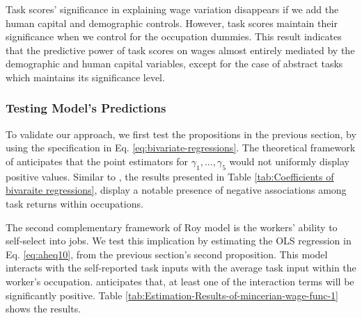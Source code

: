 \begin{onehalfspace}
Task scores' significance in explaining wage variation disappears
if we add the human capital and demographic controls. However, task
scores maintain their significance when we control for the occupation
dummies. This result indicates that the predictive power of task scores
on wages almost entirely mediated by the demographic and human capital
variables, except for the case of abstract tasks which maintains its
significance level.
\end{onehalfspace}
\begin{center}

\par\end{center}

\vspace{-1cm}

\subsubsection{Testing Model's Predictions}

To validate our approach, we first test the propositions in the previous
section, by using the specification in Eq. \ref{eq:bivariate-regressions}.
The theoretical framework of \citet{2013Autora} anticipates that
the point estimators for $\gamma_{1},...,\gamma_{5}$ would not uniformly
display positive values. Similar to \citet{2013Autora}, the results
presented in Table \ref{tab:Coefficients of bivaraite regressions},
display a notable presence of negative associations among task returns
within occupations. 
\begin{center}

\par\end{center}

\vspace{-1cm}

\begin{onehalfspace}
The second complementary framework of Roy model is the workers' ability
to self-select into jobs. We test this implication by estimating the
OLS regression in Eq. \ref{eq:aheq10}, from the previous section's
second proposition. This model interacts with the self-reported task
inputs with the average task input within the worker's occupation.
\citet{2013Autora} anticipates that, at least one of the interaction
terms will be significantly positive. Table \ref{tab:Estimation-Results-of-mincerian-wage-func-1}
shows the results.
\end{onehalfspace}
\begin{center}

\par\end{center}

